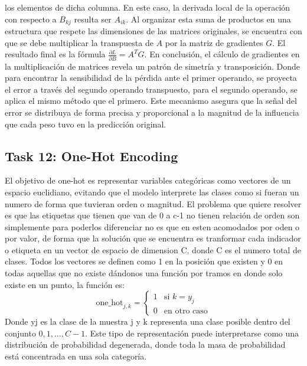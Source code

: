 ﻿\documentclass[12pt]{article}
\begin{document}
los elementos de dicha columna. En este caso, la derivada local de la operación
con respecto a $B_{kj}$ resulta ser $A_{ik}$. Al organizar esta suma de productos 
en una estructura que respete las dimensiones de las matrices originales, se encuentra
con que se debe multiplicar la transpuesta de $A$ por la matriz de 
gradientes $G$. El resultado final es la fórmula $\frac{\partial L}{\partial B} = A^T G$.
En conclusión, el cálculo de gradientes en la multiplicación de matrices revela un 
patrón de simetría y transposición. Donde para encontrar la sensibilidad de la pérdida ante el
primer operando, se proyecta el error a través del segundo operando transpuesto, para el 
segundo operando, se aplica el mismo método que el primero. Este mecanismo asegura que 
la señal del error se distribuya de forma precisa y proporcional a la magnitud de la
influencia que cada peso tuvo en la predicción original.

\subsection*{Task 12: One-Hot Encoding}
El objetivo de one-hot es representar variables categóricas como vectores de un espacio euclidiano, evitando que el modelo interprete las clases como si fueran un numero de forma que tuvieran orden o magnitud.
El problema que quiere resolver es que las etiquetas que tienen que van de 0 a c-1 no tienen relación de orden son simplemente para poderlos diferenciar no es que en esten acomodados por oden o por valor, de forma que la solución que se encuentra es tranformar cada indicador o etiqueta en un vector de espacio de dimension C, donde C es el numero total de clases. Todos los vectores se definen como 1 en la posición que existen y 0 en todas aquellas que no existe dándonos una función por tramos en donde solo existe en un punto, la función es:
\[
\text{one\_hot}_{j,k} =
\begin{cases}
1 & \text{si } k = y_j \\
0 & \text{en otro caso}
\end{cases}
\]
Donde yj es la clase de la muestra j y k representa una clase posible dentro del conjunto ${0,1,…,C-1}$.
Este tipo de representación puede interpretarse como una distribución de probabilidad degenerada, donde toda 
la masa de probabilidad está concentrada en una sola categoría.
\end{document}

